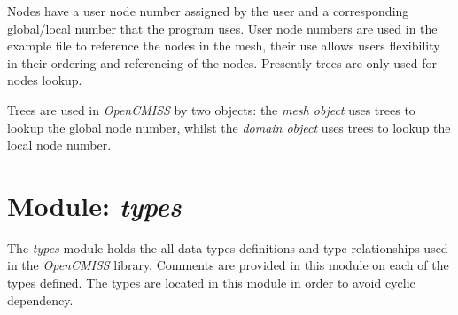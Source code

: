 Nodes have a user node number assigned by the user and a corresponding 
global/local number that the program uses. User node numbers are used in the 
example file to reference the nodes in the mesh, their use allows users 
flexibility in their ordering and referencing of the nodes. Presently trees 
are only used for nodes lookup.

Trees are used in \emph{OpenCMISS} by two objects: the \emph{mesh object} uses 
trees to lookup the global node number, whilst the \emph{domain object} uses
trees to lookup the local node number.


\section{Module: \emph{types}}
\label{sec:types}

The \emph{types} module holds the all data types definitions and type
relationships used in the \emph{OpenCMISS} library. Comments are provided 
in this module on each of the types defined. The types are located in this 
module in order to avoid cyclic dependency. 
